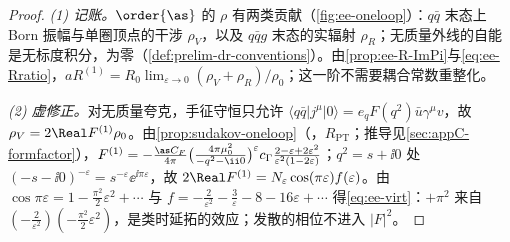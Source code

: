 \begin{proof}
\emph{(1) 记账。}$\order{\as}$ 的 $\rho$ 有两类贡献（\cref{fig:ee-oneloop}）：$q\bar q$ 末态上 Born 振幅与单圈顶点的干涉 $\rho_V$，以及 $q\bar qg$ 末态的实辐射 $\rho_R$；无质量外线的自能是无标度积分，为零（\cref{def:prelim-dr-conventions}）。由\cref{prop:ee-R-ImPi}与\cref{eq:ee-Rratio}，$aR^{(1)}=R_0\lim_{\varepsilon\to0}(\rho_V+\rho_R)/\rho_0$；这一阶不需要耦合常数重整化。

\emph{(2) 虚修正。}对无质量夸克，手征守恒只允许 $\langle q\bar q|j^\mu|0\rangle=e_qF(q^2)\bar u\gamma^\mu v$，故 $\rho_V=2\Real F^{(1)}\rho_0$。由\cref{prop:sudakov-oneloop}（\tagR，$R_{\mathrm{PT}}$；推导见\cref{sec:appC-formfactor}），$F^{(1)}=-\frac{\as C_F}{4\pi}\big(\frac{4\pi\mu_0^2}{-q^2-\ii0}\big)^{\varepsilon}c_\Gamma\frac{2-\varepsilon+2\varepsilon^2}{\varepsilon^2(1-2\varepsilon)}$；$q^2=s+\ii0$ 处 $(-s-\ii0)^{-\varepsilon}=s^{-\varepsilon}\ee^{\ii\pi\varepsilon}$，故 $2\Real F^{(1)}=N_\varepsilon\cos(\pi\varepsilon)f(\varepsilon)$。由 $\cos\pi\varepsilon=1-\frac{\pi^2}2\varepsilon^2+\cdots$ 与 $f=-\frac2{\varepsilon^2}-\frac3\varepsilon-8-16\varepsilon+\cdots$ 得\cref{eq:ee-virt}：$+\pi^2$ 来自 $(-\frac2{\varepsilon^2})(-\frac{\pi^2}2\varepsilon^2)$，是类时延拓的效应；发散的相位不进入 $|F|^2$。


\end{proof}

